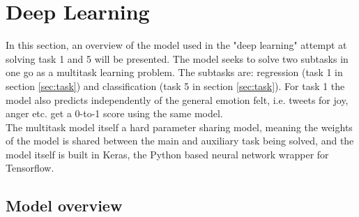 
\section{Deep Learning} \label{sec:deep}
In this section, an overview of the model used in the "deep learning" attempt at solving task 1 and 5 will be presented. The model seeks to solve two subtasks in one go as a multitask learning problem. The subtasks are: regression (task 1 in section \ref{sec:task}) and classification (task 5 in section \ref{sec:task}). For task 1 the model also predicts independently of the general emotion felt, i.e. tweets for joy, anger etc. get a 0-to-1 score using the same model. \\
The multitask model itself a hard parameter sharing model, meaning the weights of the model is shared between the main and auxiliary task being solved, and the model itself is built in Keras, the Python based neural network wrapper for Tensorflow. 

\subsection{Model overview}

